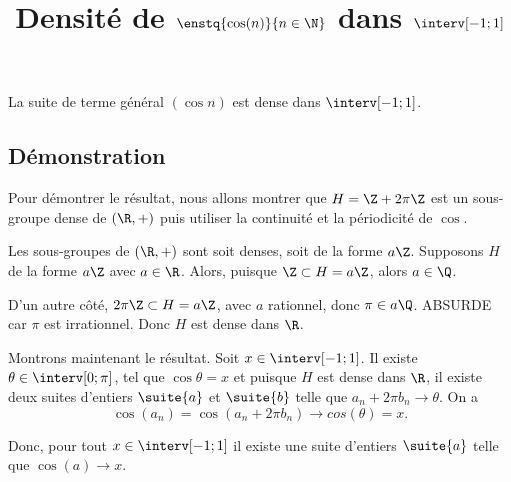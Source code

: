 \documentclass[fontsize=12pt,twoside=false,parskip=half]{scrartcl}
\title{Densité de $\enstq{\cos(n)}{n \in \N}$ dans $\interv[-1; 1]$}
\date{}
\author{}
\begin{document}
\maketitle
   \begin{Theoreme}
      La suite de terme général $(\cos n)$ est dense dans $\interv[-1; 1]$.
   \end{Theoreme}
   \subsection{Démonstration}
      Pour démontrer le résultat, nous allons montrer que $H = \Z + 2 \pi \Z$ est un sous-groupe dense 
      de $(\R, +)$ puis utiliser la continuité et la périodicité de $\cos$.
      
      Les sous-groupes de $(\R, +)$ sont soit denses, soit de la forme $a\Z$. Supposons $H$ de la forme $a\Z$ avec 
      $a \in \R$. Alors, puisque $\Z \subset H = a\Z$, alors $a \in \Q$. 
      
      D’un autre côté, $2\pi\Z \subset H = a\Z$, avec $a$ rationnel, donc $\pi \in a\Q$. ABSURDE car $\pi$ est irrationnel.
      Donc $H$ est dense dans $\R$.
      
      Montrons maintenant le résultat. Soit $x \in \interv[-1; 1]$. Il existe $\theta \in \interv[0; \pi]$, tel que 
      $\cos \theta = x$ et puisque $H$ est dense dans $\R$, il existe deux suites d’entiers $\suite{a}$ et $\suite{b}$
      telle que $a_n + 2\pi b_n \to \theta$.
      On a 
      \[
         \cos(a_n) = \cos(a_n + 2\pi b_n) \to cos(\theta) = x.
      \]
      
      Donc, pour tout $x \in \interv[-1; 1]$ il existe une suite d’entiers $\suite{a}$ telle que $\cos(a) \to x$.
\end{document}
